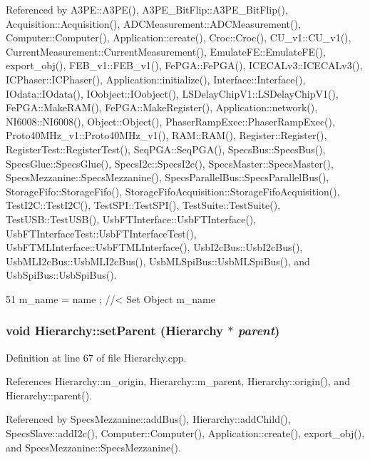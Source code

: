 Referenced by A3PE::A3PE(), A3PE\_\-BitFlip::A3PE\_\-BitFlip(), Acquisition::Acquisition(), ADCMeasurement::ADCMeasurement(), Computer::Computer(), Application::create(), Croc::Croc(), CU\_\-v1::CU\_\-v1(), CurrentMeasurement::CurrentMeasurement(), EmulateFE::EmulateFE(), export\_\-obj(), FEB\_\-v1::FEB\_\-v1(), FePGA::FePGA(), ICECALv3::ICECALv3(), ICPhaser::ICPhaser(), Application::initialize(), Interface::Interface(), IOdata::IOdata(), IOobject::IOobject(), LSDelayChipV1::LSDelayChipV1(), FePGA::MakeRAM(), FePGA::MakeRegister(), Application::network(), NI6008::NI6008(), Object::Object(), PhaserRampExec::PhaserRampExec(), Proto40MHz\_\-v1::Proto40MHz\_\-v1(), RAM::RAM(), Register::Register(), RegisterTest::RegisterTest(), SeqPGA::SeqPGA(), SpecsBus::SpecsBus(), SpecsGlue::SpecsGlue(), SpecsI2c::SpecsI2c(), SpecsMaster::SpecsMaster(), SpecsMezzanine::SpecsMezzanine(), SpecsParallelBus::SpecsParallelBus(), StorageFifo::StorageFifo(), StorageFifoAcquisition::StorageFifoAcquisition(), TestI2C::TestI2C(), TestSPI::TestSPI(), TestSuite::TestSuite(), TestUSB::TestUSB(), UsbFTInterface::UsbFTInterface(), UsbFTInterfaceTest::UsbFTInterfaceTest(), UsbFTMLInterface::UsbFTMLInterface(), UsbI2cBus::UsbI2cBus(), UsbMLI2cBus::UsbMLI2cBus(), UsbMLSpiBus::UsbMLSpiBus(), and UsbSpiBus::UsbSpiBus().


\begin{DoxyCode}
51 { m_name  = name  ; } //< Set Object m_name
\end{DoxyCode}
\hypertarget{classHierarchy_a585ad1aeec16077a0e532ab8b4fc557b}{
\subsubsection[{setParent}]{\setlength{\rightskip}{0pt plus 5cm}void Hierarchy::setParent ({\bf Hierarchy} $\ast$ {\em parent})}}
\label{classHierarchy_a585ad1aeec16077a0e532ab8b4fc557b}


Definition at line 67 of file Hierarchy.cpp.

References Hierarchy::m\_\-origin, Hierarchy::m\_\-parent, Hierarchy::origin(), and Hierarchy::parent().

Referenced by SpecsMezzanine::addBus(), Hierarchy::addChild(), SpecsSlave::addI2c(), Computer::Computer(), Application::create(), export\_\-obj(), and SpecsMezzanine::SpecsMezzanine().


